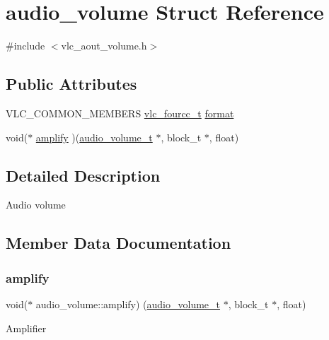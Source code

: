 \hypertarget{structaudio__volume}{}\section{audio\+\_\+volume Struct Reference}
\label{structaudio__volume}


{\ttfamily \#include $<$vlc\+\_\+aout\+\_\+volume.\+h$>$}

\subsection*{Public Attributes}
\begin{DoxyCompactItemize}
\item 
V\+L\+C\+\_\+\+C\+O\+M\+M\+O\+N\+\_\+\+M\+E\+M\+B\+E\+RS \hyperlink{vlc__common_8h_af49f89d0f752bc9cff142e43b1bd634d}{vlc\+\_\+fourcc\+\_\+t} \hyperlink{structaudio__volume_a3622369fd24616299bbc1d02c0a01f61}{format}
\item 
void($\ast$ \hyperlink{structaudio__volume_a0e176157ca69914e709788f54e5d628f}{amplify} )(\hyperlink{structaudio__volume}{audio\+\_\+volume\+\_\+t} $\ast$, block\+\_\+t $\ast$, float)
\end{DoxyCompactItemize}


\subsection{Detailed Description}
Audio volume 

\subsection{Member Data Documentation}
\mbox{\label{structaudio__volume_a0e176157ca69914e709788f54e5d628f}} 
\subsubsection{\texorpdfstring{amplify}{amplify}}
{\footnotesize\ttfamily void($\ast$ audio\+\_\+volume\+::amplify) (\hyperlink{structaudio__volume}{audio\+\_\+volume\+\_\+t} $\ast$, block\+\_\+t $\ast$, float)}

Amplifier \mbox{\label{structaudio__volume_a3622369fd24616299bbc1d02c0a01f61}} 
